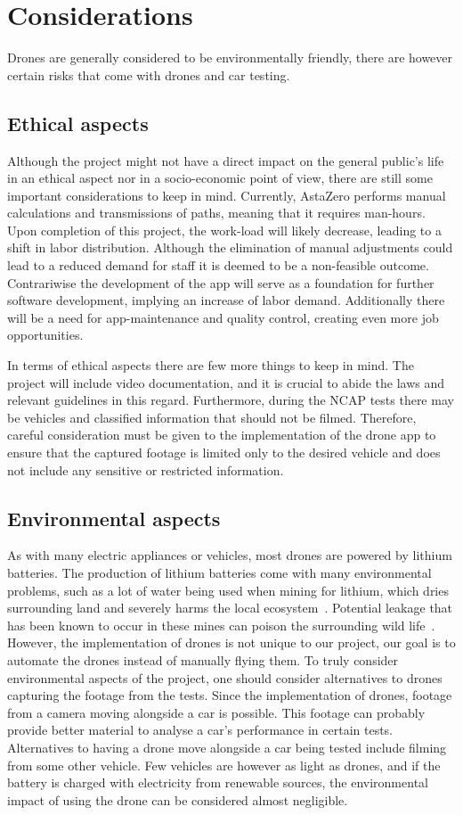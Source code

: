 \chapter{Considerations}
Drones are generally considered to be environmentally friendly, there are however certain risks that come with drones and car testing.
\section{Ethical aspects}
Although the project might not have a direct impact on the general public's life in an ethical aspect nor in a socio-economic point of view, there are still some important considerations to keep in mind. Currently, AstaZero performs manual calculations and transmissions of paths, meaning that it requires man-hours. Upon completion of this project, the work-load will likely decrease, leading to a shift in labor distribution. Although the elimination of manual adjustments could lead to a reduced demand for staff it is deemed to be a non-feasible outcome. Contrariwise the development of the app will serve as a foundation for further software development, implying an increase of labor demand. Additionally there will be a need for app-maintenance and quality control, creating even more job opportunities. 

In terms of ethical aspects there are few more things to keep in mind. The project will include video documentation, and it is crucial to abide the laws and relevant guidelines in this regard. Furthermore, during the NCAP tests there may be vehicles and classified information that should not be filmed. Therefore, careful consideration must be given to the implementation of the drone app to ensure that the captured footage is limited only to the desired vehicle and does not include any sensitive or restricted information.

\section{Environmental aspects}
As with many electric appliances or vehicles, most drones are powered by lithium batteries. The production of lithium batteries come with many environmental problems, such as a lot of water being used when mining for lithium, which dries surrounding land and severely harms the local ecosystem~\cite{BauerSophie2020Explainer:Industry}. Potential leakage that has been known to occur in these mines can poison the surrounding wild life~\cite{AmitKatwala2018TheAddiction}. However, the implementation of drones is not unique to our project, our goal is to automate the drones instead of manually flying them. To truly consider environmental aspects of the project, one should consider alternatives to drones capturing the footage from the tests. Since the implementation of drones, footage from a camera moving alongside a car is possible. This footage can probably provide better material to analyse a car's performance in certain tests. Alternatives to having a drone move alongside a car being tested include filming from some other vehicle. Few vehicles are however as light as drones, and if the battery is charged with electricity from renewable sources, the environmental impact of using the drone can be considered almost negligible. 